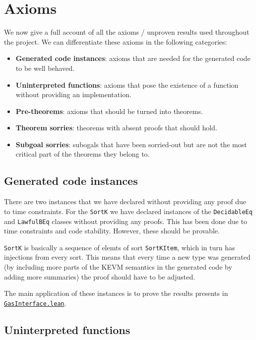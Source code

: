 \chapter{Axioms}\label{chap:axioms}

We now give a full account of all the axioms / unproven results used
throughout the project.
We can differentiate these axioms in the following categories:

\begin{itemize}
\item \textbf{Generated code instances}: axioms that are needed for the generated code to be well
  behaved.
\item \textbf{Uninterpreted functions}: axioms that pose the existence of a function without
  providing an implementation.
\item \textbf{Pre-theorems}: axioms that should be turned into theorems.
\item \textbf{Theorem sorries}: theorems with absent proofs that should hold.
\item \textbf{Subgoal sorries}: subogals that have been sorried-out but are not the most
  critical part of the theorems they belong to.
\end{itemize}

\section{Generated code instances}

There are two instances that we have declared without providing any proof due to
time constraints. For the \texttt{SortK} we have declared instances of the
\texttt{DecidableEq} and \texttt{LawfulBEq} classes without providing any
proofs. This has been done due to time constraints and code stability. However, these should be provable.

\texttt{SortK} is basically a sequence of elemts of sort \texttt{SortKItem},
which in turn has injections from every sort. This means that every time a new
type was generated (by including more parts of the KEVM semantics in the
generated code by adding more summaries) the proof should have to be adjusted.

The main application of these instances is to prove the results presents in
\href{https://runtimeverification.github.io/evm-equivalence/docs/EvmEquivalence/Interfaces/GasInterface.html}{\texttt{GasInterface.lean}}.

\section{Uninterpreted functions}

